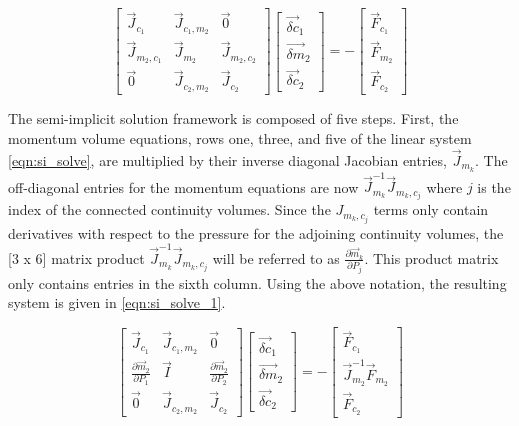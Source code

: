 \begin{equation}
\label{eqn:si_solve}
\begin{bmatrix} 
	\vec{J}_{c_1}     	& \vec{J}_{c_1,m_2} & \vec{0} 			\\
	\vec{J}_{m_2,c_1} 	& \vec{J}_{m_2} 	& \vec{J}_{m_2,c_2} \\
	\vec{0} 			& \vec{J}_{c_2,m_2} & \vec{J}_{c_2}
 \end{bmatrix} \begin{bmatrix}
 \vec{\delta c}_{1} \\
 \vec{\delta m}_{2} \\
 \vec{\delta c}_{2}
 \end{bmatrix}  = -\begin{bmatrix}
 \vec{F}_{c_1} \\
 \vec{F}_{m_2} \\
 \vec{F}_{c_2}
 \end{bmatrix}
 \end{equation}
 
 The semi-implicit solution framework is composed of five steps.
 First, the momentum volume equations, rows one, three, and five of the linear system \eqref{eqn:si_solve}, are multiplied by their inverse diagonal Jacobian entries, $\vec{J}_{m_k}$.
 The off-diagonal entries for the momentum equations are now $\vec{J}^{-1}_{m_k}\vec{J}_{m_k,c_j}$ where $j$ is the index of the connected continuity volumes.
 Since the $J_{m_k,c_j}$ terms only contain derivatives with respect to the pressure for the adjoining continuity volumes, the [3 x 6] matrix product $\vec{J}^{-1}_{m_k}\vec{J}_{m_k,c_j}$ will be referred to as $\frac{\partial \vec{m}_k}{\partial P_j}$.
 This product matrix only contains entries in the sixth column.
 Using the above notation, the resulting system is given in \eqref{eqn:si_solve_1}.
 
  \begin{equation}
 \label{eqn:si_solve_1}
 \begin{bmatrix} 
\vec{J}_{c_1} 							& \vec{J}_{c_1,m_2} & \vec{0} 									\\
\frac{\partial \vec{m}_2}{\partial P_1} & \vec{I} 			& \frac{\partial \vec{m}_2}{\partial P_2} 	\\
\vec{0} 								& \vec{J}_{c_2,m_2} & \vec{J}_{c_2} 							
\end{bmatrix} \begin{bmatrix}
 \vec{\delta c}_{1} \\
 \vec{\delta m}_{2} \\
 \vec{\delta c}_{2}
\end{bmatrix}  = -\begin{bmatrix}
 \vec{F}_{c_1} \\
 \vec{J}^{-1}_{m_2}\vec{F}_{m_2} \\
 \vec{F}_{c_2}
 \end{bmatrix}
 \end{equation}

